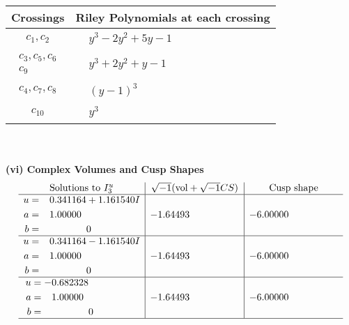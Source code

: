 \documentclass[1p]{elsarticle_modified}
\theoremstyle{definition}
\newcommand{\I}{\sqrt{-1}}
\begin{document}
\begin{tabular}{m{50pt}|m{274pt}}
Crossings & \hspace{64pt}Riley Polynomials at each crossing \\
\hline $$\begin{aligned}c_{1},c_{2}\end{aligned}$$&$\begin{aligned}
&y^3-2 y^2+5 y-1
\end{aligned}$\\
\hline $$\begin{aligned}c_{3},c_{5},c_{6}\\c_{9}\end{aligned}$$&$\begin{aligned}
&y^3+2 y^2+y-1
\end{aligned}$\\
\hline $$\begin{aligned}c_{4},c_{7},c_{8}\end{aligned}$$&$\begin{aligned}
&(y-1)^3
\end{aligned}$\\
\hline $$\begin{aligned}c_{10}\end{aligned}$$&$\begin{aligned}
&y^3
\end{aligned}$\\
\hline
\end{tabular}\\~\\
\newpage\flushleft \textbf{(vi) Complex Volumes and Cusp Shapes}
$$\begin{array}{c|c|c}  
\text{Solutions to }I^u_{3}& \I (\text{vol} + \sqrt{-1}CS) & \text{Cusp shape}\\
 \hline 
\begin{aligned}
u &= \phantom{-}0.341164 + 1.161540 I \\
a &= \phantom{-}1.00000\phantom{ +0.000000I} \\
b &= \phantom{-0.000000 } 0\end{aligned}
 & -1.64493\phantom{ +0.000000I} & -6.00000\phantom{ +0.000000I} \\ \hline\begin{aligned}
u &= \phantom{-}0.341164 - 1.161540 I \\
a &= \phantom{-}1.00000\phantom{ +0.000000I} \\
b &= \phantom{-0.000000 } 0\end{aligned}
 & -1.64493\phantom{ +0.000000I} & -6.00000\phantom{ +0.000000I} \\ \hline\begin{aligned}
u &= -0.682328\phantom{ +0.000000I} \\
a &= \phantom{-}1.00000\phantom{ +0.000000I} \\
b &= \phantom{-0.000000 } 0\end{aligned}
 & -1.64493\phantom{ +0.000000I} & -6.00000\phantom{ +0.000000I}\\
 \hline 
 \end{array}$$\newpage
\end{document}
